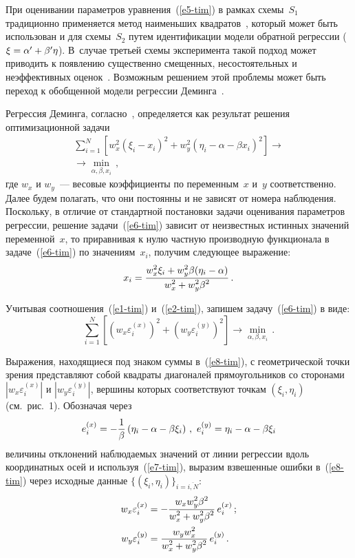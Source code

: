 \begin{multicols}{2}
  При оценивании параметров уравнения~(\ref{e5-tim}) в рамках
схемы~$S_1$ традиционно применяется метод наименьших
  квадратов~\cite{1-tim, 5-tim, 7-tim}, который может быть использован и
для схемы~$S_2$ путем идентификации модели обратной регрессии
($\xi\hm= \alpha^\prime\hm+\beta^\prime \eta$). В~случае третьей схемы
эксперимента такой подход может приводить к появлению существенно
смещенных, несостоятельных и неэффективных оценок~\cite{5-tim}.
Возможным решением этой проблемы может быть переход к обобщенной
модели регрессии
  Деминга~\cite{4-tim, 9-tim}.

  Регрессия Деминга, согласно~\cite{4-tim}, определяется как результат
решения оптимизационной задачи
  \begin{multline}
  \sum\limits_{i=1}^N \left[ w^2_x \left( \xi_i-x_i\right)^2 +w_y^2\left( \eta_i-
\alpha -\beta x_i\right)^2 \right] \to{}\\
{}\to \min\limits_{\alpha,\beta,x_i}\,,
  \label{e6-tim}
  \end{multline}
где $w_x$ и $w_y$~--- весовые коэффициенты по переменным~$x$ и~$y$
соответственно. Далее будем полагать, что они постоянны и не зависят от
номера наблюдения. Поскольку, в отличие от стандартной постановки
задачи оценивания параметров регрессии, решение задачи~(\ref{e6-tim})
зависит от неизвестных истинных значений переменной~$x$, то приравнивая
к нулю частную производную функционала в задаче~(\ref{e6-tim}) по
значениям~$x_i$, получим следующее выражение:
\begin{equation}
x_i = \displaystyle\frac{\displaystyle w^2_x \xi_i +w^2_y \beta (\eta_i-\alpha)\mathstrut}{\displaystyle w_x^2 + w_y^2 \beta^2\mathstrut}\,.
\label{e7-tim}
\end{equation}

  Учитывая соотношения~(\ref{e1-tim}) и~(\ref{e2-tim}), запишем
задачу~(\ref{e6-tim}) в виде:
  \begin{equation}
  \sum\limits_{i=1}^N \left[ \left( w_x \varepsilon_i^{(x)}\right)^2 +\left( w_y
\varepsilon_i^{(y)}\right)^2 \right] \to \min\limits_{\alpha,\beta, x_i}\,.
  \label{e8-tim}
  \end{equation}

  Выражения, находящиеся под знаком суммы в~(\ref{e8-tim}), с
геометрической точки зрения представляют собой квадраты диагоналей
прямоугольников со сторонами $\left\vert w_x \varepsilon_i^{(x)}\right\vert$ и
$\left\vert w_y \varepsilon_i^{(y)}\right\vert$, вершины которых
соответствуют точкам $(\xi_i,\eta_i)$ (см.\ рис.~1). Обозначая через
  $$
  e_i^{(x)}= -\displaystyle\frac{\displaystyle 1\mathstrut}{\displaystyle \beta\mathstrut}\left( \eta_i -\alpha-\beta\xi_i\right)\,,\ e_i^{(y)}
=\eta_i-\alpha-\beta\xi_i
  $$
величины отклонений наблюдаемых значений от линии регрессии вдоль
координатных осей и используя~(\ref{e7-tim}), выразим взвешенные ошибки
в~(\ref{e8-tim}) через исходные данные $\{ (\xi_i,\eta_i)\}_{i=\overline{i,N}}$:
\begin{align*}
w_x\varepsilon_i^{(x)}&= -\displaystyle\frac{\displaystyle w_x w_y^2\beta^2\mathstrut}{\displaystyle w_x^2+ w_y^2\beta^2\mathstrut}
\,e^{(x)}_i\,;\\
 w_y \varepsilon_i^{(y)} &= \displaystyle\frac{\displaystyle w_y w_x^2\mathstrut}{\displaystyle w_x^2
+w_y^2\beta^2\mathstrut}\, e^{(y)}_i\,.
\end{align*}


\end{multicols}

